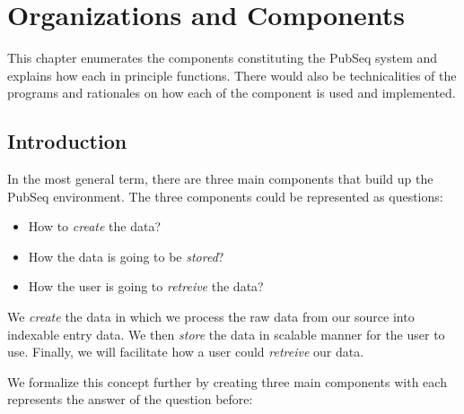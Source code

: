 
\chapter{Organizations and Components} %

\label{Chapter3} %


This chapter enumerates the components constituting the PubSeq system and explains how each in principle functions. There would also be technicalities of the programs and rationales on how each of the component is used and implemented.


\section{Introduction}

\label{sec:Chap3Intro}

In the most general term, there are three main components that build up the PubSeq environment. The three components could be represented as questions:

\begin{itemize}
\item How to \textit{create} the data?
\item How the data is going to be \textit{stored}?
\item How the user is going to \textit{retreive} the data?
\end{itemize}

We \textit{create} the data in which we process the raw data from our source into indexable entry data. We then \textit{store} the data in scalable manner for the user to use. Finally, we will facilitate how a user could \textit{retreive} our data.

We formalize this concept further by creating three main components with each represents the answer of the question before:

